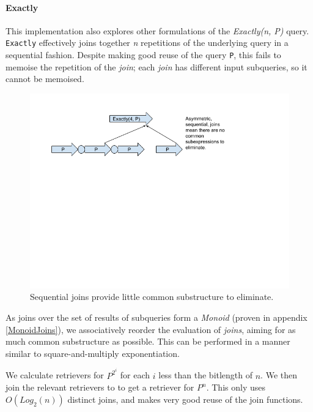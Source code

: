 \documentclass[12pt,a4paper,twoside,openright]{report}
\newcommand\codeName[1]{\texttt{#1}}
\newcommand\mathName[1]{\textit{#1}}
\begin{document}
		\paragraph{Exactly}
		This implementation also explores other formulations of the \mathName{Exactly(n, P)} query. \codeName{Exactly} effectively joins together \mathName{n} repetitions of the underlying query in a sequential fashion. Despite making good reuse of the query \codeName{P}, this fails to memoise the repetition of the \mathName{join}; each \mathName{join} has different input subqueries, so it cannot be memoised.
		

\begin{figure}[ht]
\centering
  \includegraphics[width=\textwidth]{figs/SequentialJoins.png}
  \caption{Sequential joins provide little common substructure to eliminate.}
  \label{fig:SequentialJoins}
\end{figure}
		
		
		As joins over the set of results of subqueries form a \mathName{Monoid} (proven in appendix \ref{MonoidJoins}), we associatively reorder the evaluation of \mathName{joins}, aiming for as much common substructure as possible. This can be performed in a manner similar to square-and-multiply exponentiation.

We calculate retrievers for $P^{2^i}$ for each $i$ less than the bitlength of $n$. We then join the relevant retrievers to to get a retriever for $P^n$. This only uses $O(Log_2(n))$ distinct joins, and makes very good reuse of the join functions. 
\end{document}
